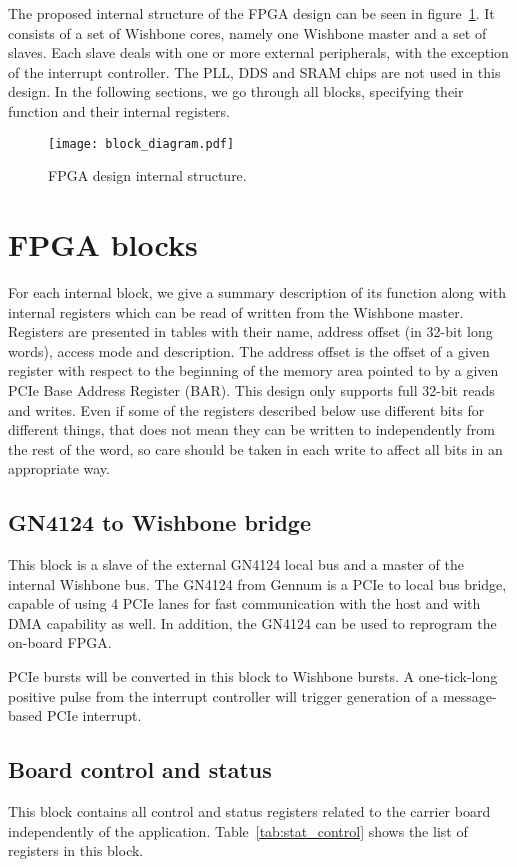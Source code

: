 \documentclass{article}
\begin{document}
The proposed internal structure of the FPGA design can be seen in figure~\ref{fig:block_diagram}. It consists of a set of Wishbone cores, namely one Wishbone master and a set of slaves. Each slave deals with one or more external peripherals, with the exception of the interrupt controller. The PLL, DDS and SRAM chips are not used in this design. In the following sections, we go through all blocks, specifying their function and their internal registers.

\begin{figure}[htbp]
  \centering
  \texttt{[image: block\_diagram.pdf]}
  \caption{FPGA design internal structure.}
  \label{fig:block_diagram}
\end{figure}

\section{FPGA blocks}
For each internal block, we give a summary description of its function along with internal registers which can be read of written from the Wishbone master. Registers are presented in tables with their name, address offset (in 32-bit long words), access mode and description. The address offset is the offset of a given register with respect to the beginning of the memory area pointed to by a given PCIe Base Address Register (BAR). This design only supports full 32-bit reads and writes. Even if some of the registers described below use different bits for different things, that does not mean they can be written to independently from the rest of the word, so care should be taken in each write to affect all bits in an appropriate way.

\subsection{GN4124 to Wishbone bridge}
This block is a slave of the external GN4124 local bus and a master of the internal Wishbone bus. The GN4124 from Gennum is a PCIe to local bus bridge, capable of using 4 PCIe lanes for fast communication with the host and with DMA capability as well. In addition, the GN4124 can be used to reprogram the on-board FPGA. 

PCIe bursts will be converted in this block to Wishbone bursts. A one-tick-long positive pulse from the interrupt controller will trigger generation of a message-based PCIe interrupt.

\subsection{Board control and status}
This block contains all control and status registers related to the carrier board independently of the application. Table~\ref{tab:stat_control} shows the list of registers in this block.
\end{document}
